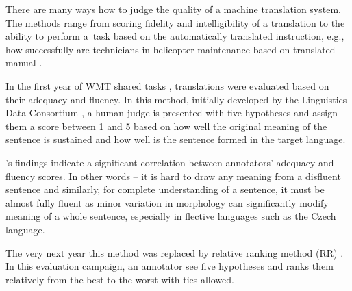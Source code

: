 There are many ways how to judge the quality of a machine translation system. 
The methods range from scoring fidelity and intelligibility of a translation to the ability to perform a~task based on the automatically translated instruction, e.g., how successfully are technicians in  helicopter maintenance based on translated manual \cite{Sinaiko}.

In the first year of WMT shared tasks \citep{koehn-monz:2006:WMT}, translations were evaluated based on their adequacy and fluency. 
In this method, initially  developed by the Linguistics Data Consortium ,  a human judge is presented with five hypotheses and assign them a score between 1 and 5 based on how well the original meaning of the sentence is sustained and how well is the sentence formed in the target language.

\cite{callison-burch-etal-2007-meta}'s findings indicate a significant correlation between annotators’ adequacy and fluency scores. In other words -- it is hard to draw any meaning from a disfluent sentence and similarly, for complete understanding of a sentence, it must be almost fully fluent as minor variation in morphology can significantly modify meaning of a whole sentence, especially in flective languages such as the Czech language. 



The very next year this method was replaced by relative ranking method (RR) \citep{callison-burch-etal-2007-meta}. In this evaluation campaign, an annotator see five hypotheses and ranks them relatively from the best to the worst with ties allowed.


